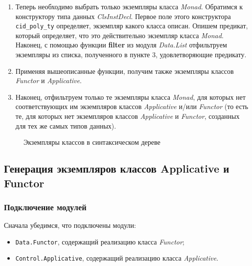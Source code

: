 \begin{enumerate}
\item Теперь необходимо выбрать только экземпляры класса \textit{Monad}. Обратимся к конструктору типа данных \textit{ClsInstDecl}. Первое поле этого конструктора \lstinline{cid_poly_ty} определяет, экземпляр какого класса описан. Опишем предикат, который определяет, что это действительно экземпляр класса \textit{Monad}. Наконец, с помощью функции \textbf{filter} из модуля \textit{Data.List} отфильтруем экземпляры из списка, полученного в пункте 3, удовлетворяющие предикату.
\item Применяя вышеописанные функции, получим также экземпляры классов \textit{Functor} и \textit{Applicative}.
\item Наконец, отфильтруем только те экземпляры класса \textit{Monad}, для которых нет соответствующих им экземпляров классов \textit{Applicative} и/или \textit{Functor} (то есть те, для которых нет экземпляров классов \textit{Applicative} и \textit{Functor}, созданных для тех же самых типов данных).
\end{enumerate}

\begin{figure}[h]
\caption{Экземпляры классов в синтаксическом дереве}\label{filter}
\end{figure}
\newpage
\subsection{Генерация экземпляров классов Applicative и Functor}
\subsubsection{Подключение модулей}
Сначала убедимся, что подключены модули:
    \begin{itemize}
        \item \lstinline{Data.Functor}, содержащий реализацию класса \textit{Functor};
        \item \lstinline{Control.Applicative}, содержащий реализацию класса \textit{Applicative}.
    \end{itemize}

